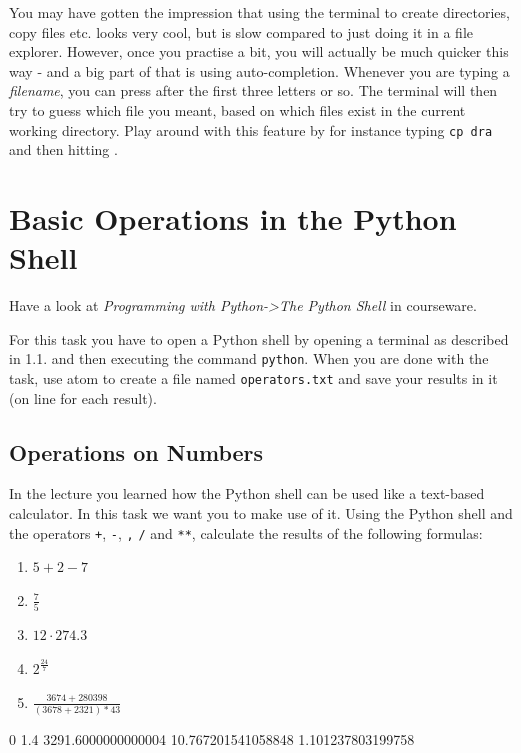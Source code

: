 You may have gotten the impression that using the terminal to create directories, copy files etc. looks very cool, but is slow compared to just doing it in a file explorer. However, once you practise a bit, you will actually be much quicker this way - and a big part of that is using auto-completion. Whenever you are typing a \textit{filename}, you can press \keys{\tab} after the first three letters or so. The terminal will then try to guess which file you meant, based on which files exist in the current working directory. Play around with this feature by for instance typing \texttt{cp dra} and then hitting \keys{\tab}.


\section{Basic Operations in the Python Shell}

Have a look at \textit{Programming with Python->The Python Shell} in courseware.
\newline


\noindent For this task you have to open a Python shell by opening a terminal as described in 1.1. and then executing the command \texttt{python}. When you are done with the task, use atom to create a file named \texttt{operators.txt} and save your results in it (on line for each result).

\subsection{Operations on Numbers}

In the lecture you learned how the Python shell can be used like a text-based calculator. In this task we want you to make use of it. Using the Python shell and the operators \texttt+, \texttt-, \texttt*, \texttt/ and \texttt{**}, calculate the results of the following formulas:

\begin{enumerate}

\item $5 + 2 - 7$
\item $\frac{7}{5}$
\item $12 \cdot 274.3$
\item $2^{\frac{24}{7}}$
\item $\frac{3674 + 280398}{(3678 + 2321) * 43}$

\end{enumerate}

\begin{solution}
    \begin{outputcode}
0
1.4
3291.6000000000004
10.767201541058848
1.101237803199758
    \end{outputcode}
\end{solution}

